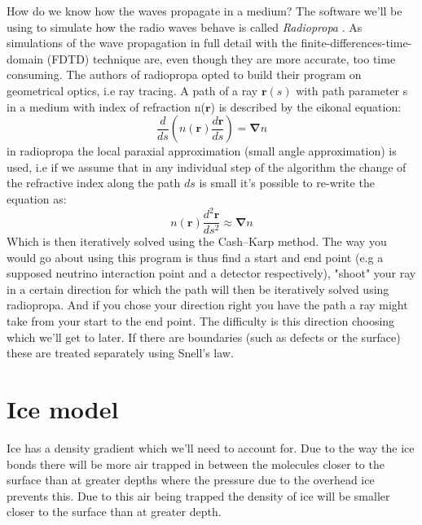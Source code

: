 How do we know how the waves propagate in a medium?  The software we'll be
using to simulate how the radio waves behave is called \textit{Radiopropa}
\cite{Winchen_2019}. As  simulations of the wave propagation in full detail
with the finite-differences-time-domain (FDTD) technique \cite{1138693} are,
even though they are more accurate, too time consuming. The authors of
radiopropa opted to build their program on geometrical optics, i.e ray
tracing. A path of a ray $\mathbf{r}(s)$ with path parameter s in a medium
with index of refraction n($\mathbf{r}$) is described by the eikonal
equation\cite{herman2019treatise}:
\begin{equation}
	\frac{d}{ds}\left(n(\mathbf{r})\frac{d\mathbf{r}}{ds}\right) = \mathbf{\nabla} n
\end{equation}
in radiopropa the local paraxial approximation (small angle approximation) is
used, i.e if we assume that in any individual step of the algorithm the change
of the refractive index along the path $ds$ is small it's possible to re-write
the equation as:
\begin{equation}
	n(\mathbf{r})\frac{d^2\mathbf{r}}{ds^2} \approx \mathbf{\nabla} n
	\label{eqn:radiopropaformula}
\end{equation}
Which is then iteratively solved using the Cash–Karp method.  The way you would
go about using this program is thus find a start and end point (e.g a supposed
neutrino interaction point and a detector respectively), "shoot" your ray in a
certain direction for which the path will then be iteratively solved using
radiopropa. And if you chose your direction right you have the path a ray might
take from your start to the end point.  The difficulty is this direction
choosing which we'll get to later.  If there are boundaries (such as defects or
the surface) these are treated separately using Snell's law. 
\section{Ice model}
\label{section:Ice Model}
Ice has a density gradient which we'll need to account for. Due to the way the
ice bonds there will be more air trapped in between the molecules closer to the
surface than at greater depths where the pressure due to the overhead ice
prevents this.  Due to this air being trapped the density of ice will be
smaller closer to the surface than at greater depth.  

